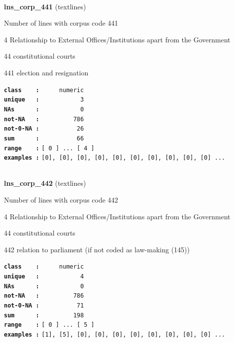 \documentclass[]{article}
\begin{document}
~

\textbf{lns\_corp\_441} (textlines)

Number of lines with corpus code 441

4 Relationship to External Offices/Institutions apart from the
Government

44 constitutional courts

441 election and resignation

\textbf{\texttt{class\ \ \ \ :}} \texttt{~~~~~numeric}\\
\textbf{\texttt{unique\ \ \ :}} \texttt{~~~~~~~~~~~3}\\
\textbf{\texttt{NAs\ \ \ \ \ \ :}} \texttt{~~~~~~~~~~~0}\\
\textbf{\texttt{not-NA\ \ \ :}} \texttt{~~~~~~~~~786}\\
\textbf{\texttt{not-0-NA\ :}} \texttt{~~~~~~~~~~26}\\
\textbf{\texttt{sum\ \ \ \ \ \ :}} \texttt{~~~~~~~~~~66}\\
\textbf{\texttt{range\ \ \ \ :}}
\texttt{{[}\ 0\ {]}\ ...\ {[}\ 4\ {]}}\\
\textbf{\texttt{examples\ :}}
\texttt{{[}0{]},\ {[}0{]},\ {[}0{]},\ {[}0{]},\ {[}0{]},\ {[}0{]},\ {[}0{]},\ {[}0{]},\ {[}0{]},\ {[}0{]}\ ...}\\

~

\textbf{lns\_corp\_442} (textlines)

Number of lines with corpus code 442

4 Relationship to External Offices/Institutions apart from the
Government

44 constitutional courts

442 relation to parliament (if not coded as law-making (145))

\textbf{\texttt{class\ \ \ \ :}} \texttt{~~~~~numeric}\\
\textbf{\texttt{unique\ \ \ :}} \texttt{~~~~~~~~~~~4}\\
\textbf{\texttt{NAs\ \ \ \ \ \ :}} \texttt{~~~~~~~~~~~0}\\
\textbf{\texttt{not-NA\ \ \ :}} \texttt{~~~~~~~~~786}\\
\textbf{\texttt{not-0-NA\ :}} \texttt{~~~~~~~~~~71}\\
\textbf{\texttt{sum\ \ \ \ \ \ :}} \texttt{~~~~~~~~~198}\\
\textbf{\texttt{range\ \ \ \ :}}
\texttt{{[}\ 0\ {]}\ ...\ {[}\ 5\ {]}}\\
\textbf{\texttt{examples\ :}}
\texttt{{[}1{]},\ {[}5{]},\ {[}0{]},\ {[}0{]},\ {[}0{]},\ {[}0{]},\ {[}0{]},\ {[}0{]},\ {[}0{]},\ {[}0{]}\ ...}\\
\end{document}
